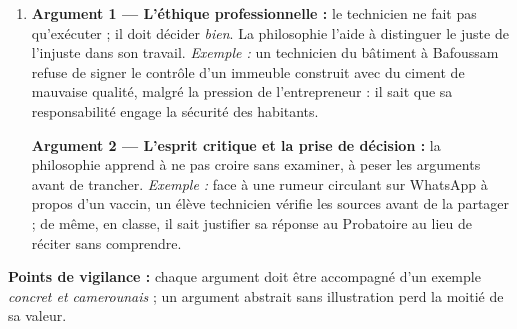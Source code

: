 \documentclass[11pt]{article}
\begin{document}
\begin{corrige}
\begin{enumerate}
\item \textbf{Argument 1 — L'éthique professionnelle :} le technicien ne fait pas qu'exécuter ; il doit décider \emph{bien}. La philosophie l'aide à distinguer le juste de l'injuste dans son travail. \emph{Exemple :} un technicien du bâtiment à Bafoussam refuse de signer le contrôle d'un immeuble construit avec du ciment de mauvaise qualité, malgré la pression de l'entrepreneur : il sait que sa responsabilité engage la sécurité des habitants.

\textbf{Argument 2 — L'esprit critique et la prise de décision :} la philosophie apprend à ne pas croire sans examiner, à peser les arguments avant de trancher. \emph{Exemple :} face à une rumeur circulant sur WhatsApp à propos d'un vaccin, un élève technicien vérifie les sources avant de la partager ; de même, en classe, il sait justifier sa réponse au Probatoire au lieu de réciter sans comprendre.
\end{enumerate}
\textbf{Points de vigilance :} chaque argument doit être accompagné d'un exemple \emph{concret et camerounais} ; un argument abstrait sans illustration perd la moitié de sa valeur.
\end{corrige}
\end{document}
